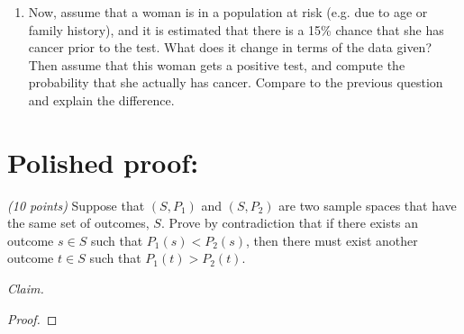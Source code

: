 \documentclass[12pt]{article}
\begin{document}
\begin{enumerate}
\begin{enumerate}

\item Now, assume that a woman is in a population at risk (e.g. due to age or family history), and it is estimated that there is a 15\% chance that she has cancer prior to the test. What does it change in terms of the data given? Then assume that this woman gets a positive test, and compute the probability that she actually has cancer. Compare to the previous question and explain the difference. \newline

\end{enumerate}


\end{enumerate}
\newpage %

\section*{Polished proof:} 

\emph{(10 points)} Suppose that \( (S,P_1) \) and \( (S,P_2) \) are two sample spaces that have the same set of outcomes, \( S \). Prove by contradiction that if there exists an outcome \( s \in S \) such that \( P_1(s) < P_2(s) \), then there must exist another outcome \( t \in S \) such that \( P_1(t) > P_2(t) \).

\noindent \emph{Claim.}

\begin{proof}
\end{proof}
\end{document}

